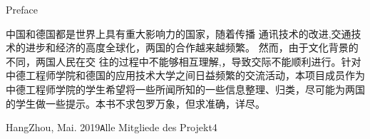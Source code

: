 \titlefont  Preface\par

\thispagestyle{empty}
 \vspace*{5cm}
 \normalfont
 中国和德国都是世界上具有重大影响力的国家，随着传播 通讯技术的改进,交通技术的进步和经济的高度全球化，两国的合作越来越频繁。 然而，由于文化背景的不同，两国人民在交 往的过程中不能够相互理解,，导致交际不能顺利进行。针对中德工程师学院和德国的应用技术大学之间日益频繁的交流活动，本项目成员作为中德工程师学院的学生希望将一些所闻所知的一些信息整理、归类，尽可能为两国的学生做一些提示。本书不求包罗万象，但求准确，详尽。
 
 
\vspace{\baselineskip}
\begin{flushright}\noindent
HangZhou, Mai.  2019\hfill {\texttt Alle Mitgliede des Projekt4}\\
\end{flushright}
